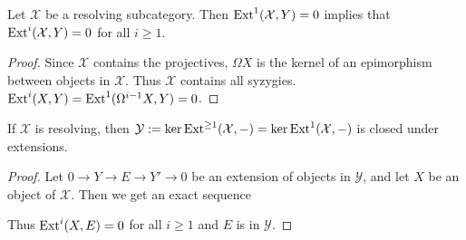 \begin{lemma}\label{lem:resolving_ext_vanish}
	Let $\mathcal X$ be a resolving subcategory. Then $\operatorname{Ext}^1(\mathcal X, Y) = 0$ implies that $\operatorname{Ext}^i(\mathcal X, Y)=0$ for all $i \geq 1$.
	\begin{proof}
		Since $\mathcal X$ contains the projectives, $\Omega X$ is the kernel of an epimorphism between objects in $\mathcal X$. Thus $\mathcal X$ contains all syzygies. $\operatorname{Ext}^i(X, Y) = \operatorname{Ext}^1(\Omega^{i-1}X, Y) = 0$.
	\end{proof}
\end{lemma}

\begin{prop}\label{prop:complement_closed_under_extension}
	If $\mathcal X$ is resolving, then $\mathcal Y := \ker\operatorname{Ext}^{\geq 1}(\mathcal X, -) = \ker\operatorname{Ext}^{1}(\mathcal X, -)$ is closed under extensions.
	\begin{proof}
		Let $0 \to Y \to E \to Y' \to 0$ be an extension of objects in $\mathcal Y$, and let $X$ be an object of $\mathcal X$. Then we get an exact sequence  
		\begin{center}
		\end{center}
		Thus $\operatorname{Ext}^i(X, E)=0$ for all $i \geq 1$ and $E$ is in $\mathcal Y$.
	\end{proof}
\end{prop}

